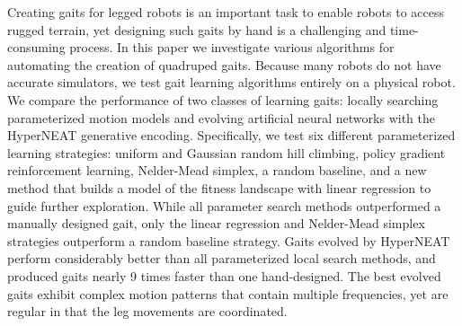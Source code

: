 Creating gaits for legged robots is an important task to enable robots
to access rugged terrain, yet designing such gaits by hand is a
challenging and time-consuming process. In this paper we investigate
various algorithms for automating the creation of quadruped
gaits. Because many robots do not have accurate simulators, we test
gait learning algorithms entirely on a physical robot.  We compare the
performance of two classes of learning gaits: locally searching
parameterized motion models and evolving artificial neural networks
with the HyperNEAT generative encoding. Specifically, we test six
different parameterized learning strategies: uniform and Gaussian
random hill climbing, policy gradient reinforcement learning,
Nelder-Mead simplex, a random baseline, and a new method that builds a
model of the fitness landscape with linear regression to guide further
exploration.  While all parameter search methods outperformed a
manually designed gait, only the linear regression and Nelder-Mead
simplex strategies outperform a random baseline strategy. Gaits
evolved by HyperNEAT perform considerably better than all
parameterized local search methods, and produced gaits nearly 9 times faster than one hand-designed.  The best evolved gaits exhibit
complex motion patterns that contain multiple frequencies, yet are
regular in that the leg movements are coordinated.


